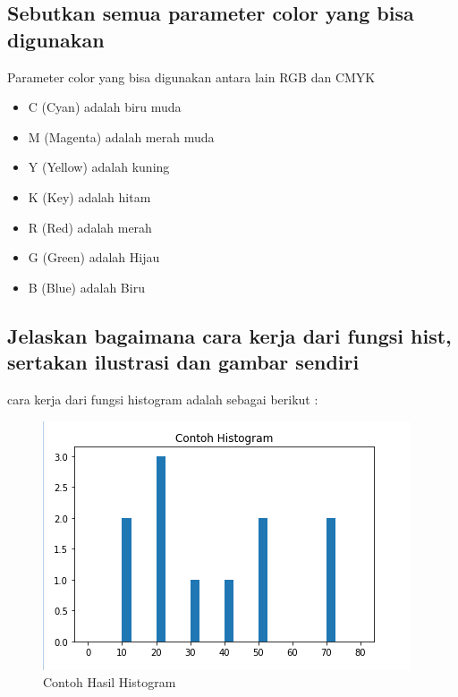 \subsection{Sebutkan semua parameter color yang bisa digunakan}
Parameter color yang bisa digunakan antara lain RGB dan CMYK
\begin{itemize}
    \item C (Cyan) adalah biru muda
    \item M (Magenta) adalah merah muda
    \item Y (Yellow) adalah kuning
    \item K (Key) adalah hitam
    \item R (Red) adalah merah
    \item G (Green) adalah Hijau
    \item B (Blue) adalah Biru
    
\end{itemize}

\subsection{Jelaskan bagaimana cara kerja dari fungsi hist, sertakan ilustrasi dan gambar sendiri}
cara kerja dari fungsi histogram adalah sebagai berikut :


\begin{figure}[h]
\centering
\includegraphics[scale=0.7]{figures/6/Teori/1174051/3.png}
\caption{Contoh Hasil Histogram}
\label{fig:contoh}
\end{figure}

